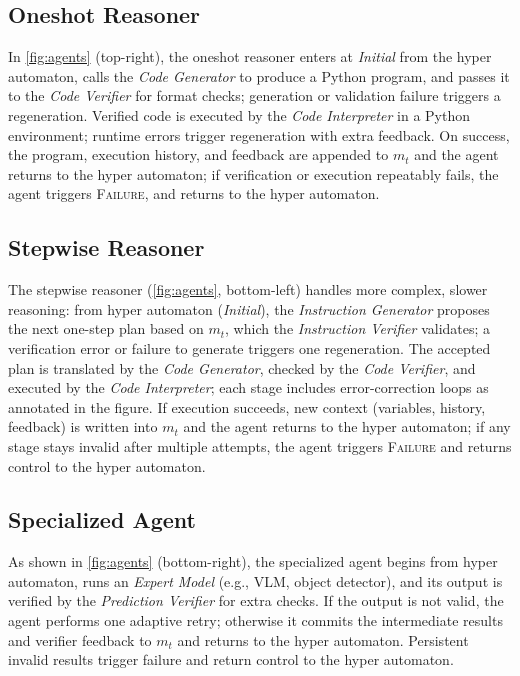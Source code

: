 \documentclass{article} %
\newcommand{\eg}{e.g.}
\begin{document}
\subsection{Oneshot Reasoner}
In \autoref{fig:agents} (top-right), the oneshot reasoner enters at \emph{Initial} from the hyper automaton, calls the \emph{Code Generator} to produce a Python program, and passes it to the \emph{Code Verifier} for format checks; generation or validation failure triggers a regeneration. Verified code is executed by the \emph{Code Interpreter} in a Python environment; runtime errors trigger regeneration with extra feedback. On success, the program, execution history, and feedback are appended to $m_t$ and the agent returns to the hyper automaton; if verification or execution repeatably fails, the agent triggers \textsc{Failure}, and returns to the hyper automaton.

\subsection{Stepwise Reasoner}
The stepwise reasoner (\autoref{fig:agents}, bottom-left) handles more complex, slower reasoning: from hyper automaton (\emph{Initial}), the \emph{Instruction Generator} proposes the next one-step plan based on $m_t$, which the \emph{Instruction Verifier} validates; a verification error or failure to generate triggers one regeneration. The accepted plan is translated by the \emph{Code Generator}, checked by the \emph{Code Verifier}, and executed by the \emph{Code Interpreter}; each stage includes error-correction loops as annotated in the figure. If execution succeeds, new context (variables, history, feedback) is written into $m_t$ and the agent returns to the hyper automaton; if any stage stays invalid after multiple attempts, the agent triggers \textsc{Failure} and returns control to the hyper automaton.

\subsection{Specialized Agent}
As shown in \autoref{fig:agents} (bottom-right), the specialized agent begins from hyper automaton, runs an \emph{Expert Model} (\eg, VLM, object detector), and its output is verified by the \emph{Prediction Verifier} for extra checks. If the output is not valid, the agent performs one adaptive retry; otherwise it commits the intermediate results and verifier feedback to $m_t$ and returns to the hyper automaton. Persistent invalid results trigger failure and return control to the hyper automaton.
\end{document}
